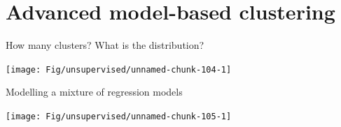 \documentclass[
  ignorenonframetext,
  aspectratio=169]{beamer}
\begin{document}
\hypertarget{advanced-model-based-clustering}{%
\section{Advanced model-based
clustering}\label{advanced-model-based-clustering}}

\begin{frame}{How many clusters? What is the distribution?}
\protect\hypertarget{how-many-clusters-what-is-the-distribution}{}
\scriptsize

\normalsize

\scriptsize

\normalsize

\scriptsize

\begin{center}\texttt{[image: Fig/unsupervised/unnamed-chunk-104-1]} \end{center}

\normalsize
\end{frame}

\begin{frame}{Modelling a mixture of regression models}
\protect\hypertarget{modelling-a-mixture-of-regression-models}{}
\scriptsize

\begin{center}\texttt{[image: Fig/unsupervised/unnamed-chunk-105-1]} \end{center}

\normalsize
\end{frame}
\end{document}

